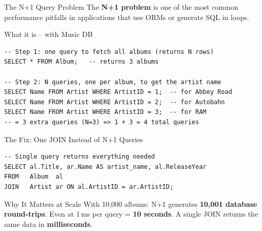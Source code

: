 \begin{frame}[fragile]{The N+1 Query Problem}
  The \textbf{N+1 problem} is one of the most common performance pitfalls
  in applications that use ORMs or generate SQL in loops.

  \begin{block}{What it is -- with Music DB}
\begin{lstlisting}[style=sqlstyle]
-- Step 1: one query to fetch all albums (returns N rows)
SELECT * FROM Album;   -- returns 3 albums

-- Step 2: N queries, one per album, to get the artist name
SELECT Name FROM Artist WHERE ArtistID = 1;  -- for Abbey Road
SELECT Name FROM Artist WHERE ArtistID = 2;  -- for Autobahn
SELECT Name FROM Artist WHERE ArtistID = 3;  -- for RAM
-- = 3 extra queries (N=3) => 1 + 3 = 4 total queries
\end{lstlisting}
  \end{block}

  \begin{block}{The Fix: One JOIN Instead of N+1 Queries}
\begin{lstlisting}[style=sqlstyle]
-- Single query returns everything needed
SELECT al.Title, ar.Name AS artist_name, al.ReleaseYear
FROM   Album  al
JOIN   Artist ar ON al.ArtistID = ar.ArtistID;
\end{lstlisting}
  \end{block}

  \begin{alertblock}{Why It Matters at Scale}
    With 10,000 albums: N+1 generates \textbf{10,001 database round-trips}.
    Even at 1\,ms per query = \textbf{10 seconds}.
    A single JOIN returns the same data in \textbf{milliseconds}.
  \end{alertblock}
\end{frame}

